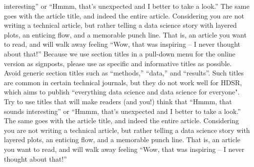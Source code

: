 \documentclass[]{hdsr}
\begin{document}
interesting'' or ``Hmmm, that's unexpected and I better to take a look.''   The same goes with the article title, and indeed the entire article.  Considering you are not writing a technical article, but rather telling a data science story with layered plots, an enticing flow, and a memorable punch line. That is, an article you want to read, and will walk away feeling ``Wow, that was inspiring -- I never thought about that!'' Because we use section titles in a pull-down menu for the online version as signposts, please use as specific and informative titles as possible. Avoid generic section titles such as ``methods,'' ``data,'' and ``results''. Such titles are common in certain technical journals, but they do not work well for HDSR, which aims to publish ``everything data science and data science for everyone". Try to use titles that will make readers (and you!) think that ``Hmmm, that sounds interesting'' or ``Hmmm, that's unexpected and I better to take a look.''   The same goes with the article title, and indeed the entire article.  Considering you are not writing a technical article, but rather telling a data science story with layered plots, an enticing flow, and a memorable punch line. That is, an article you want to read, and will walk away feeling ``Wow, that was inspiring -- I never thought about that!'' 

\printbibliography
\end{document}
